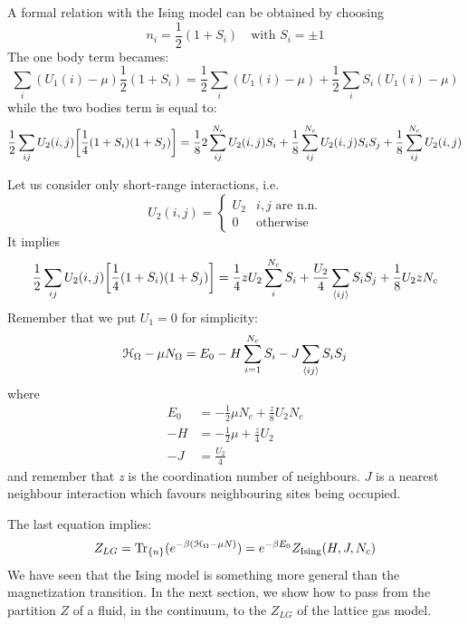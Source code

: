 \documentclass[../main/main.tex]{subfiles}
\begin{document}
A formal relation with the Ising model can be obtained by choosing
\begin{equation}
  n_i = \frac{1}{2} (1+S_i) \quad \text{with } S_i = \pm 1
\end{equation}
The one body term becames:
\begin{equation}
  \sum_{i}^{} (U_1 (i) - \mu )  \frac{1}{2} (1+S_i) = \frac{1}{2} \sum_{i}^{} (U_1 (i) - \mu ) + \frac{1}{2} \sum_{i}^{} S_i (U_1 (i) - \mu )
\end{equation}
while the two bodies term is equal to:
\begin{equation}
  \frac{1}{2} \sum_{ij}^{} U_2 (i,j) \qty[\frac{1}{4} (1+S_i)(1+S_j)] = \frac{1}{8} 2 \sum_{ij}^{N_c} U_2 (i,j) S_i + \frac{1}{8}  \sum_{ij}^{N_c} U_2 (i,j) S_i S_j + \frac{1}{8} \sum_{ij}^{N_c} U_2 (i,j)
\end{equation}

Let us consider only short-range interactions, i.e.
\begin{equation}
U_2 (i,j) =
  \begin{cases}
   U_2 & i,j \text{ are n.n.}\\
   0 & \text{otherwise}
  \end{cases}
\end{equation}
It implies
\begin{equation}
    \frac{1}{2} \sum_{ij}^{} U_2 (i,j) \qty[\frac{1}{4} (1+S_i)(1+S_j)] =
      \frac{1}{4} z U_2 \sum_{i}^{N_c} S_i + \frac{U_2}{4} \sum_{\expval{ij} }^{} S_i S_j + \frac{1}{8} U_2 z N_c
\end{equation}
Remember that we put \( U_1 = 0 \) for simplicity:
\begin{equation}
    \mathcal{H}_ \Omega  - \mu N_ \Omega   =  E_0 - H \sum_{i=1}^{N_c} S_i - J \sum_{\expval{ij} }^{} S_i S_j
\end{equation}
where
\begin{subequations}
\begin{align}
     E_0 & = - \frac{1}{2} \mu N_c + \frac{z}{8} U_2 N_c \\
       -H &= - \frac{1}{2} \mu + \frac{z}{4} U_2 \\
         -J & = \frac{U_2}{4}
\end{align}
\end{subequations}
and remember that \emph{z} is the coordination number of neighbours.
 \( J \) is a nearest neighbour interaction which favours neighbouring sites being occupied.

The last equation implies:
\begin{equation}
  Z_{LG} = \Tr_{\{n\}}(e^{-\beta (\mathcal{H}_ \Omega -\mu N)} ) = e^{-\beta E_0} Z_{\text{Ising}} (H,J,N_c)
\end{equation}
We have seen that the Ising model is something more general than the magnetization transition.
In the next section, we show how to pass from the partition \( Z \) of a fluid, in the continuum, to the  \( Z_{LG} \) of the lattice gas model.
\end{document}
